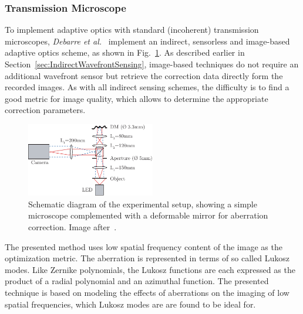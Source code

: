 \subsubsection{Transmission Microscope}
\label{sec:TransmissionMicroscope}
To implement adaptive optics with standard (incoherent) transmission microscopes, \emph{Debarre et al.}~\cite{wide_AOM_loew_freq} implement an indirect, sensorless and image-based adaptive optics scheme, as shown in Fig.~\ref{fig:widefield_simple_microscope}. As described earlier in Section~\ref{sec:IndirectWavefrontSensing}, image-based techniques do not require an additional wavefront sensor but retrieve the correction data directly form the recorded images. As with all indirect sensing schemes, the difficulty is to find a good metric for image quality, which allows to determine the appropriate correction parameters.

\begin{figure}[htb]
	\centering
		\includegraphics[width=0.50\textwidth]{images/widefield_simple_microscope.pdf}
	\caption{Schematic diagram of the experimental setup, showing a simple microscope complemented with a deformable mirror for aberration correction. Image after~\cite{wide_AOM_loew_freq}.}
	\label{fig:widefield_simple_microscope}
\end{figure}

The presented method uses low spatial frequency content of the image as the optimization metric. The aberration is represented in terms of so called Lukosz modes. Like Zernike polynomials, the Lukosz functions are each expressed as the product of a radial polynomial and an azimuthal function. The presented technique is based on modeling the effects of aberrations on the imaging of low spatial frequencies, which Lukosz modes are are found to be ideal for.

